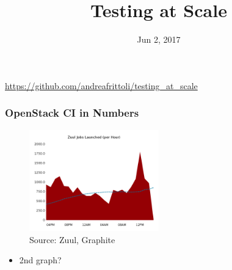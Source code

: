 \documentclass[aspectratio=169,11pt,hyperref={colorlinks=true}]{beamer}
\author[Andrea Frittoli]{%
    \texorpdfstring{
        \begin{columns}
            \column{.45\linewidth}
            \centering
            Andrea Frittoli\\
            \href{mailto:andrea.frittoli@gmail.com}{andrea.frittoli@gmail.com}\\
            \texttt{andreaf on Freenode}\\
            \texttt{@blackchip76 on Twitter}
        \end{columns}
   }
   {Andrea Frittoli}
}
\date{Jun 2, 2017}
\title[Testing at Scale
\hspace{2em}\insertframenumber/\inserttotalframenumber]{Testing at Scale}
\begin{document}
{
\begin{frame}[noframenumbering]
    \hypersetup{colorlinks,urlcolor=white}
    \titlepage{}
    \centering
    \href{https://github.com/andreafrittoli/tempest\_at\_scale}{https://github.com/andreafrittoli/testing\_at\_scale}
\end{frame}
}

\begin{frame}
    \frametitle{OpenStack CI in Numbers}
    \begin{figure}
    \begin{center}
    	\includegraphics[width=0.5\textwidth]{zuul_all_jobs.png}
         \caption{Source: Zuul, Graphite}
    \end{center}
    \end{figure}
    \begin{itemize}
        \item{2nd graph?}
    \end{itemize}
\end{frame}
\end{document}
